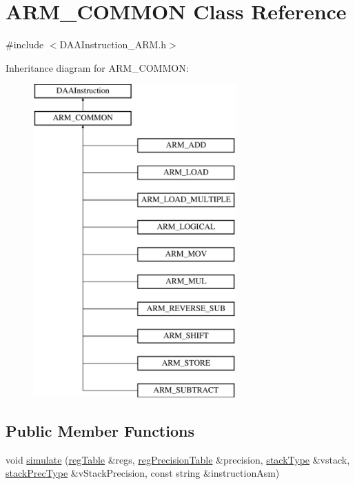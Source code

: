 \hypertarget{classARM__COMMON}{}\section{A\+R\+M\+\_\+\+C\+O\+M\+M\+ON Class Reference}
\label{classARM__COMMON}


{\ttfamily \#include $<$D\+A\+A\+Instruction\+\_\+\+A\+R\+M.\+h$>$}

Inheritance diagram for A\+R\+M\+\_\+\+C\+O\+M\+M\+ON\+:\begin{figure}[H]
\begin{center}
\leavevmode
\includegraphics[height=12.000000cm]{classARM__COMMON}
\end{center}
\end{figure}
\subsection*{Public Member Functions}
\begin{DoxyCompactItemize}
\item 
void \hyperlink{classARM__COMMON_a89eb552311ce787557a976aee2fa2db6}{simulate} (\hyperlink{DAAInstruction_8h_af0fae93a861de9cf37988d5673cac523}{reg\+Table} \&regs, \hyperlink{DAAInstruction_8h_a0e8cae02815a5f8adc750122d790b455}{reg\+Precision\+Table} \&precision, \hyperlink{DAAInstruction_8h_a1b0e70ac1a04f06c8132055ed01f589f}{stack\+Type} \&vstack, \hyperlink{DAAInstruction_8h_ac5cb793e9dac3fa9693da78b7e29ab30}{stack\+Prec\+Type} \&v\+Stack\+Precision, const string \&instruction\+Asm)
\end{DoxyCompactItemize}
